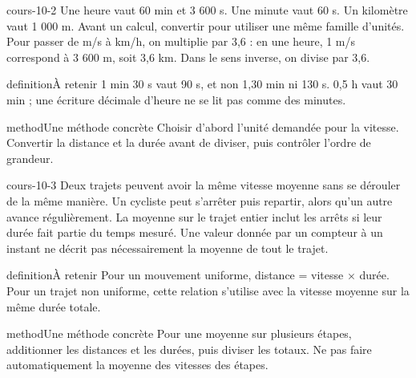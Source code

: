 \documentclass[12pt,twoside,openany]{book}
\begin{document}
\label{ch-10-cours-2}
\begin{pcFiche}{cours-10-2}
Une heure vaut 60 min et 3 600 s. Une minute vaut 60 s. Un kilomètre vaut 1 000 m. Avant un calcul, convertir pour utiliser une même famille d’unités. Pour passer de m/s à km/h, on multiplie par 3,6 : en une heure, 1 m/s correspond à 3 600 m, soit 3,6 km. Dans le sens inverse, on divise par 3,6.\par
{}
\begin{pcEncadre}{definition}{À retenir}
1 min 30 s vaut 90 s, et non 1,30 min ni 130 s. 0,5 h vaut 30 min ; une écriture décimale d’heure ne se lit pas comme des minutes.\par
\end{pcEncadre}
\begin{pcEncadre}{method}{Une méthode concrète}
Choisir d’abord l’unité demandée pour la vitesse. Convertir la distance et la durée avant de diviser, puis contrôler l’ordre de grandeur.\par
\end{pcEncadre}
\end{pcFiche}
\label{ch-10-cours-3}
\begin{pcFiche}{cours-10-3}
Deux trajets peuvent avoir la même vitesse moyenne sans se dérouler de la même manière. Un cycliste peut s’arrêter puis repartir, alors qu’un autre avance régulièrement. La moyenne sur le trajet entier inclut les arrêts si leur durée fait partie du temps mesuré. Une valeur donnée par un compteur à un instant ne décrit pas nécessairement la moyenne de tout le trajet.\par
{}
\begin{pcEncadre}{definition}{À retenir}
Pour un mouvement uniforme, distance = vitesse \(\times\) durée. Pour un trajet non uniforme, cette relation s’utilise avec la vitesse moyenne sur la même durée totale.\par
\end{pcEncadre}
\begin{pcEncadre}{method}{Une méthode concrète}
Pour une moyenne sur plusieurs étapes, additionner les distances et les durées, puis diviser les totaux. Ne pas faire automatiquement la moyenne des vitesses des étapes.\par
\end{pcEncadre}
\end{pcFiche}
\end{document}
